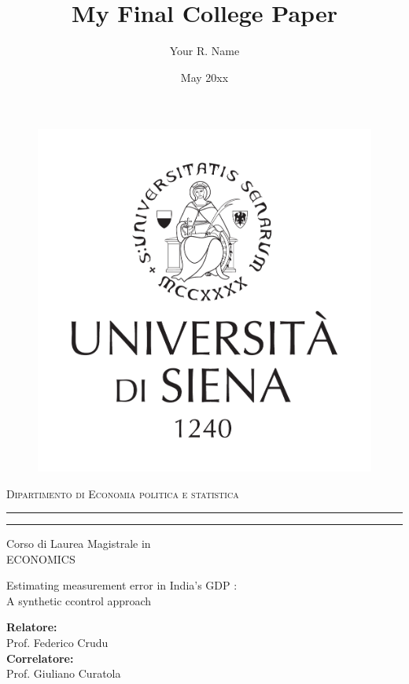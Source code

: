 \documentclass[12pt,nobind, a4paper]{reedthesis}
\title{My Final College Paper}
\author{Your R. Name}
\date{May 20xx}
\begin{document}
	
		\begin{titlepage}
		\topmargin -2.5cm
	\end{titlepage}
	\begin{figure}[ht]
		\begin{center}
			\includegraphics[scale=.34]{unisilogo.pdf}
		\end{center}
	\end{figure}
	\begin{center}
		{{\Large{\textsc{Dipartimento di Economia politica e statistica}}}}
		\rule[0.1cm]{15.8cm}{0.1mm}
		\rule[0.5cm]{15.8cm}{0.6mm}
		\renewcommand*\rmdefault{cmss}
		Corso di Laurea Magistrale in \\ ECONOMICS 
	\end{center}
	\begin{center}
		\begin{huge}
			Estimating measurement error in India's GDP : \\
			\vspace{3mm}
			\Large A synthetic ccontrol approach
		\end{huge}
	\end{center}
	\vspace{12mm}
	\par
	\noindent
	\begin{minipage}[t]{0.55\textwidth}
		{\large{\textbf{Relatore:}\\
				Prof. Federico Crudu}\\
			\textbf{Correlatore:}\\
			Prof. Giuliano Curatola}
	\end{minipage}
\end{document}
